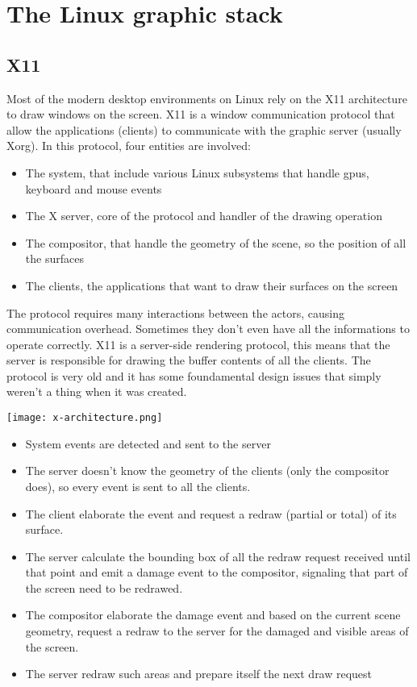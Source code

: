 \chapter{The Linux graphic stack}
\section{X11}
Most of the modern desktop environments on Linux rely on the X11 architecture to draw windows on the screen. X11 is a window communication protocol that allow the applications (clients) to communicate with the graphic server (usually Xorg). In this protocol, four entities are involved:
\begin{itemize}
	\item The system, that include various Linux subsystems that handle gpus, keyboard and mouse events
	\item The X server, core of the protocol and handler of the drawing operation
	\item The compositor, that handle the geometry of the scene, so the position of all the surfaces
	\item The clients, the applications that want to draw their surfaces on the screen
\end{itemize}
The protocol requires many interactions between the actors, causing communication overhead. Sometimes they don't even have all the informations to operate correctly. X11 is a server-side rendering protocol, this means that the server is responsible for drawing the buffer contents of all the clients. The protocol is very old and it has some foundamental design issues that simply weren't a thing when it was created.
\newpage

\begin{multicols}{2}
\vspace*{\fill}
\centering
\texttt{[image: x-architecture.png]}\\
\label{pinki}
\vspace*{\fill}
\columnbreak
\vspace*{\fill}
\begin{itemize}
	\item[1] System events are detected and sent to the server
	\item[2] The server doesn't know the geometry of the clients (only the compositor does), so every event is sent to all the clients.
	\item[3] The client elaborate the event and request a redraw (partial or total) of its surface.
	\item[4] The server calculate the bounding box of all the redraw request received until that point and emit a damage event to the compositor, signaling that part of the screen need to be redrawed.
	\item[5] The compositor elaborate the damage event and based on the current scene geometry, request a redraw to the server for the damaged and visible areas of the screen.
	\item[6] The server redraw such areas and prepare itself the next draw request
\end{itemize}
\vspace*{\fill}
\end{multicols}
\newpage

